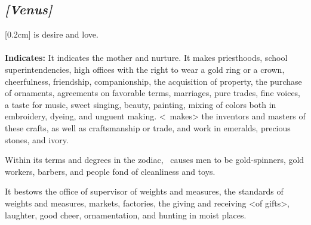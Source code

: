 \subsection{\textit{[Venus]}}
[0.2cm]
\Venus{} is desire and love. \\
\\
\textbf{Indicates:} It indicates the mother and nurture. It makes priesthoods, school superintendencies, high offices with the right to wear a gold ring or a crown, cheerfulness, friendship, companionship, the acquisition of property, the purchase of ornaments, agreements on favorable terms, marriages, pure trades, fine voices, a taste for music, sweet singing, beauty, painting, mixing of colors both in embroidery, dyeing, and unguent making. <\Venus\, makes> the inventors and masters of these crafts, as well as craftsmanship or trade, and work in emeralds, precious stones, and ivory. 

\mndl[0.2cm]
Within its terms and degrees in the zodiac, \Venus\, causes men to be gold-spinners, gold workers, barbers, and people fond of cleanliness and toys. 

It bestows the office of supervisor of weights and measures, the standards of weights and measures, markets, factories, the giving and receiving <of gifts>, laughter, good cheer, ornamentation, and hunting in moist places.

